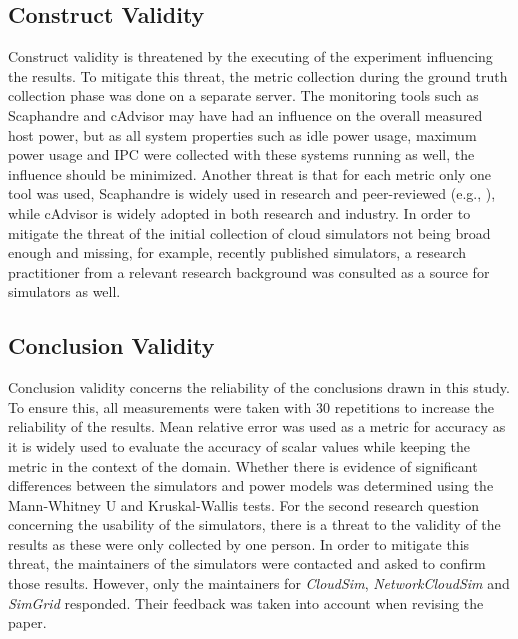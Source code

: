 \subsection{Construct Validity}
Construct validity is threatened by the executing of the experiment influencing the results. To mitigate this threat, the metric collection during the ground truth collection phase was done on a separate server. The monitoring tools such as Scaphandre and cAdvisor may have had an influence on the overall measured host power, but as all system properties such as idle power usage, maximum power usage and IPC were collected with these systems running as well, the influence should be minimized. Another threat is that for each metric only one tool was used, Scaphandre is widely used in research and peer-reviewed (e.g., \cite{centofanti_impact_2024, jay_experimental_2023, cadorel_protocol_2024, shankaranarayanan_poet_2024, gudepu_demonstrating_2024}), while cAdvisor is widely adopted in both research and industry. In order to mitigate the threat of the initial collection of cloud simulators not being broad enough and missing, for example, recently published simulators, a research practitioner from a relevant research background was consulted as a source for simulators as well. 

\subsection{Conclusion Validity}
Conclusion validity concerns the reliability of the conclusions drawn in this study. To ensure this, all measurements were taken with 30 repetitions to increase the reliability of the results. Mean relative error was used as a metric for accuracy as it is widely used to evaluate the accuracy of scalar values while keeping the metric in the context of the domain. Whether there is evidence of significant differences between the simulators and power models was determined using the Mann-Whitney U and Kruskal-Wallis tests. For the second research question concerning the usability of the simulators, there is a threat to the validity of the results as these were only collected by one person. In order to mitigate this threat, the maintainers of the simulators were contacted and asked to confirm those results. However, only the maintainers for \textit{CloudSim}, \textit{NetworkCloudSim} and \textit{SimGrid} responded. Their feedback was taken into account when revising the paper.
